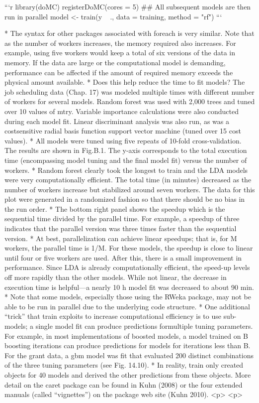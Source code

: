 ```{r}
library(doMC)
registerDoMC(cores = 5)
## All subsequent models are then run in parallel
model <- train(y ~ ., data = training, method = "rf")
```


* The syntax for other packages associated with foreach is very similar. Note
that as the number of workers increases, the memory required also increases.
For example, using five workers would keep a total of six versions of the data
in memory. If the data are large or the computational model is demanding,
performance can be affected if the amount of required memory exceeds the
physical amount available.
* Does this help reduce the time to fit models? The job scheduling data
(Chap. 17) was modeled multiple times with different number of workers for
several models. Random forest was used with 2,000 trees and tuned over 10
values of mtry. Variable importance calculations were also conducted during
each model fit. Linear discriminant analysis was also run, as was a costsensitive
radial basis function support vector machine (tuned over 15 cost
values). 
* All models were tuned using five repeats of 10-fold cross-validation.
The results are shown in Fig.B.1. The y-axis corresponds to the total execution
time (encompassing model tuning and the final model fit) versus the
number of workers. 
* Random forest clearly took the longest to train and the
LDA models were very computationally efficient. The total time (in minutes)
decreased as the number of workers increase but stabilized around seven
workers. The data for this plot were generated in a randomized fashion so
that there should be no bias in the run order. 
* The bottom right panel shows
the speedup which is the sequential time divided by the parallel time. For example,
a speedup of three indicates that the parallel version was three times
faster than the sequential version. 
* At best, parallelization can achieve linear
speedups; that is, for M workers, the parallel time is 1/M. For these models,
the speedup is close to linear until four or five workers are used. After this,
there is a small improvement in performance. Since LDA is already computationally
efficient, the speed-up levels off more rapidly than the other models.
While not linear, the decrease in execution time is helpful—a nearly 10 h
model fit was decreased to about 90 min.
* Note that some models, especially those using the RWeka package, may
not be able to be run in parallel due to the underlying code structure.
* 
One additional “trick” that train exploits to increase computational efficiency
is to use sub-models; a single model fit can produce predictions formultiple tuning parameters. For example, in most implementations of boosted
models, a model trained on B boosting iterations can produce predictions for
models for iterations less than B. For the grant data, a gbm model was fit
that evaluated 200 distinct combinations of the three tuning parameters (see
Fig. 14.10). 
* In reality, train only created objects for 40 models and derived
the other predictions from these objects.
More detail on the caret package can be found in Kuhn (2008) or the four
extended manuals (called “vignettes”) on the package web site (Kuhn 2010).
<p>
<p>
